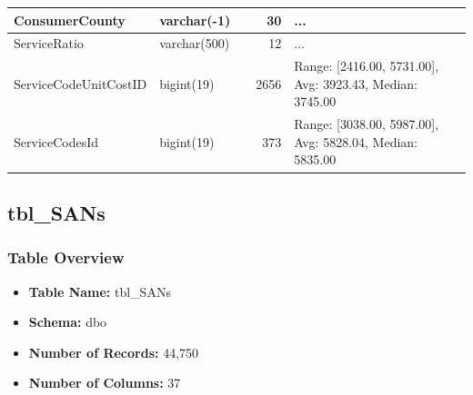 \begin{landscape}
\begin{longtable}{|l|l|l|r|p{6cm}|}
\hline
ConsumerCounty & varchar(-1) &  & 30 & ... \\
\hline
ServiceRatio & varchar(500) &  & 12 & ... \\
\hline
ServiceCodeUnitCostID & bigint(19) &  & 2656 & Range: [2416.00, 5731.00], Avg: 3923.43, Median: 3745.00 \\
\hline
ServiceCodesId & bigint(19) &  & 373 & Range: [3038.00, 5987.00], Avg: 5828.04, Median: 5835.00 \\
\hline
\end{longtable}

\subsection{tbl\_SANs}

\subsubsection{Table Overview}
\begin{itemize}
\item \textbf{Table Name:} tbl\_SANs
\item \textbf{Schema:} dbo
\item \textbf{Number of Records:} 44,750
\item \textbf{Number of Columns:} 37
\end{itemize}


\end{landscape}
